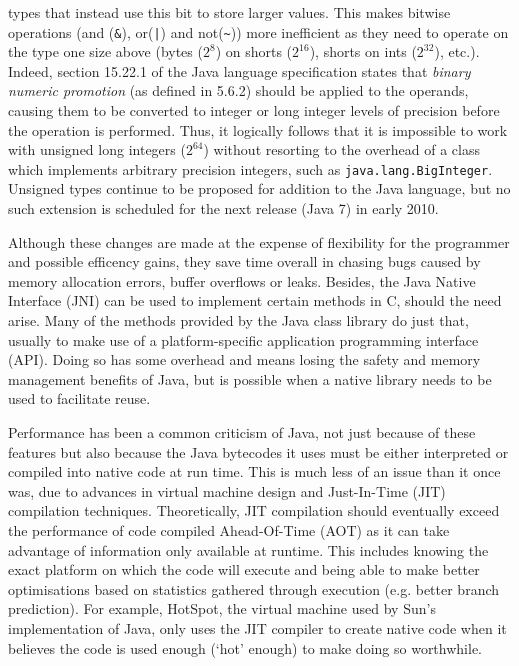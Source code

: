 \begin{itemize}
  types that instead use this bit to store larger values.  This makes
  bitwise operations (and (\texttt{\&}), or(\texttt{|}) and
  not(\texttt{\~})) more inefficient as they need to operate on the
  type one size above (bytes ($2^8$) on shorts ($2^{16}$), shorts on
  ints ($2^{32}$), etc.).  Indeed, section 15.22.1 of the Java
  language specification \cite{javaspec} states that \emph{binary
    numeric promotion} (as defined in 5.6.2) should be applied to the
  operands, causing them to be converted to integer or long integer
  levels of precision before the operation is performed.  Thus, it
  logically follows that it is impossible to work with unsigned long
  integers ($2^64$) without resorting to the overhead of a class which
  implements arbitrary precision integers, such as
  \texttt{java.lang.BigInteger}.  Unsigned types continue to be
  proposed for addition to the Java language, but no such extension is
  scheduled for the next release (Java 7) in early 2010.
\end{itemize}

Although these changes are made at the expense of flexibility for the
programmer and possible efficency gains, they save time overall in
chasing bugs caused by memory allocation errors, buffer overflows or
leaks.  Besides, the Java Native Interface (JNI) can be used to
implement certain methods in C, should the need arise.  Many of the
methods provided by the Java class library do just that, usually to
make use of a platform-specific application programming interface
(API).  Doing so has some overhead and means losing the safety and
memory management benefits of Java, but is possible when a native
library needs to be used to facilitate reuse.

Performance has been a common criticism of Java, not just because of
these features but also because the Java bytecodes it uses must be
either interpreted or compiled into native code at run time.  This is
much less of an issue than it once was, due to advances in virtual
machine design and Just-In-Time (JIT) compilation techniques.
Theoretically, JIT compilation should eventually exceed the
performance of code compiled Ahead-Of-Time (AOT) as it can take
advantage of information only available at runtime.  This includes
knowing the exact platform on which the code will execute and being
able to make better optimisations based on statistics gathered through
execution (e.g. better branch prediction).  For example, HotSpot, the
virtual machine used by Sun's implementation of Java, only uses the
JIT compiler to create native code when it believes the code is used
enough (`hot' enough) to make doing so worthwhile.

